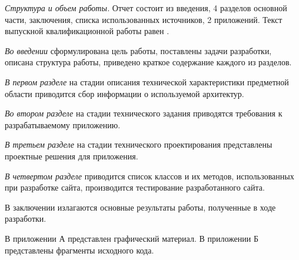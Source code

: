 \emph{Структура и объем работы.} Отчет состоит из введения, 4 разделов основной части, заключения, списка использованных источников, 2 приложений. Текст выпускной квалификационной работы равен .

\emph{Во введении} сформулирована цель работы, поставлены задачи разработки, описана структура работы, приведено краткое содержание каждого из разделов.

\emph{В первом разделе} на стадии описания технической характеристики предметной области приводится сбор информации о используемой архитектур.

\emph{Во втором разделе} на стадии технического задания приводятся требования к разрабатываемому приложению.

\emph{В третьем разделе} на стадии технического проектирования представлены проектные решения для приложения.

\emph{В четвертом разделе} приводится список классов и их методов, использованных при разработке сайта, производится тестирование разработанного сайта.

В заключении излагаются основные результаты работы, полученные в ходе разработки.

В приложении А представлен графический материал.
В приложении Б представлены фрагменты исходного кода. 
